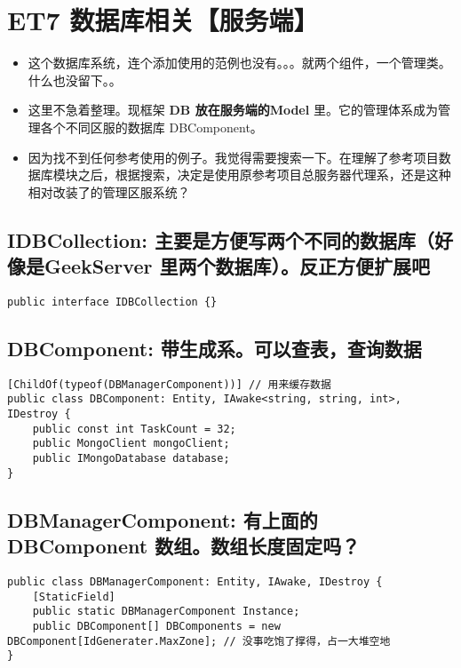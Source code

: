 \documentclass[9pt, b5paper]{article}
\begin{document}
\section{ET7 数据库相关【服务端】}
\label{sec-6}
\begin{itemize}
\item 这个数据库系统，连个添加使用的范例也没有。。。就两个组件，一个管理类。什么也没留下。。
\item 这里不急着整理。现框架 \textbf{DB 放在服务端的Model} 里。它的管理体系成为管理各个不同区服的数据库 DBComponent。
\item 因为找不到任何参考使用的例子。我觉得需要搜索一下。在理解了参考项目数据库模块之后，根据搜索，决定是使用原参考项目总服务器代理系，还是这种相对改装了的管理区服系统？
\end{itemize}
\subsection{IDBCollection: 主要是方便写两个不同的数据库（好像是GeekServer 里两个数据库）。反正方便扩展吧}
\label{sec-6-1}
\begin{verbatim}
public interface IDBCollection {}
\end{verbatim}
\subsection{DBComponent: 带生成系。可以查表，查询数据}
\label{sec-6-2}
\begin{verbatim}
[ChildOf(typeof(DBManagerComponent))] // 用来缓存数据
public class DBComponent: Entity, IAwake<string, string, int>, IDestroy {
    public const int TaskCount = 32;
    public MongoClient mongoClient;
    public IMongoDatabase database;
}
\end{verbatim}
\subsection{DBManagerComponent: 有上面的 DBComponent 数组。数组长度固定吗？}
\label{sec-6-3}
\begin{verbatim}
public class DBManagerComponent: Entity, IAwake, IDestroy {
    [StaticField]
    public static DBManagerComponent Instance;
    public DBComponent[] DBComponents = new DBComponent[IdGenerater.MaxZone]; // 没事吃饱了撑得，占一大堆空地
}
\end{verbatim}
\end{document}
